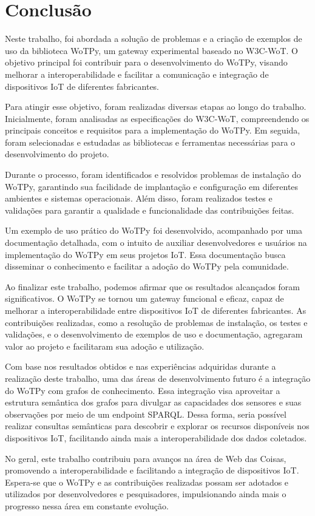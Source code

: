 \chapter{Conclusão}

Neste trabalho, foi abordada a solução de problemas e a criação de exemplos de uso da biblioteca WoTPy, um gateway experimental baseado no W3C-WoT. O objetivo principal foi contribuir para o desenvolvimento do WoTPy, visando melhorar a interoperabilidade e facilitar a comunicação e integração de dispositivos IoT de diferentes fabricantes.

Para atingir esse objetivo, foram realizadas diversas etapas ao longo do trabalho. Inicialmente, foram analisadas as especificações do W3C-WoT, compreendendo os principais conceitos e requisitos para a implementação do WoTPy. Em seguida, foram selecionadas e estudadas as bibliotecas e ferramentas necessárias para o desenvolvimento do projeto.

Durante o processo, foram identificados e resolvidos problemas de instalação do WoTPy, garantindo sua facilidade de implantação e configuração em diferentes ambientes e sistemas operacionais. Além disso, foram realizados testes e validações para garantir a qualidade e funcionalidade das contribuições feitas.

Um exemplo de uso prático do WoTPy foi desenvolvido, acompanhado por uma documentação detalhada, com o intuito de auxiliar desenvolvedores e usuários na implementação do WoTPy em seus projetos IoT. Essa documentação busca disseminar o conhecimento e facilitar a adoção do WoTPy pela comunidade.

Ao finalizar este trabalho, podemos afirmar que os resultados alcançados foram significativos. O WoTPy se tornou um gateway funcional e eficaz, capaz de melhorar a interoperabilidade entre dispositivos IoT de diferentes fabricantes. As contribuições realizadas, como a resolução de problemas de instalação, os testes e validações, e o desenvolvimento de exemplos de uso e documentação, agregaram valor ao projeto e facilitaram sua adoção e utilização.

Com base nos resultados obtidos e nas experiências adquiridas durante a realização deste trabalho, uma das áreas de desenvolvimento futuro é a integração do WoTPy com grafos de conhecimento. Essa integração visa aproveitar a estrutura semântica dos grafos para divulgar as capacidades dos sensores e suas observações por meio de um endpoint SPARQL. Dessa forma, seria possível realizar consultas semânticas para descobrir e explorar os recursos disponíveis nos dispositivos IoT, facilitando ainda mais a interoperabilidade dos dados coletados.

No geral, este trabalho contribuiu para avanços na área de Web das Coisas, promovendo a interoperabilidade e facilitando a integração de dispositivos IoT. Espera-se que o WoTPy e as contribuições realizadas possam ser adotados e utilizados por desenvolvedores e pesquisadores, impulsionando ainda mais o progresso nessa área em constante evolução.